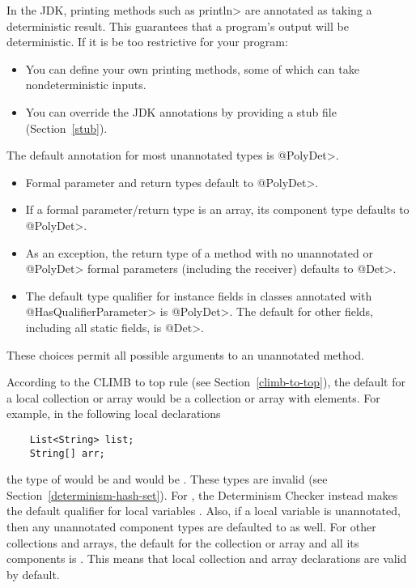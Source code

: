 
In the JDK, printing methods such as \<println> are annotated as taking a
deterministic result.  This guarantees that a program's output will be
deterministic.  If it is be too restrictive for your program:
\begin{itemize}
\item
  You can define your own printing methods, some of which can take
  nondeterministic inputs.
\item
  You can override the JDK annotations by providing a stub file
  (Section~\ref{stub}).
\end{itemize}



The default annotation for most unannotated types is \<@PolyDet>.

\begin{itemize}
\item
  Formal parameter and return types default to \<@PolyDet>.
\item
  If a formal parameter/return type is an array, its component type defaults to
  \<@PolyDet>.
\item
  As an exception, the return type of a method with no unannotated or
  \<@PolyDet> formal parameters (including the receiver) defaults to
  \<@Det>.
\item
  The default type qualifier for instance fields in classes annotated with
  \<@HasQualifierParameter> is \<@PolyDet>. The default for other fields,
  including all static fields, is \<@Det>.
\end{itemize}

These choices permit all possible arguments to an unannotated method.

According to the CLIMB to top rule (see Section~\ref{climb-to-top}), the default
for a local collection or array would be a  collection or array
with  elements. For example, in the following local declarations
\begin{Verbatim}
    List<String> list;
    String[] arr;
\end{Verbatim}
the type of  would be  and
 would be . These types are invalid (see
Section~\ref{determinism-hash-set}). For , the Determinism Checker
instead makes the default qualifier for local variables . Also, if a local
 variable is unannotated, then any unannotated component types are
defaulted to  as well. For other collections and arrays, the default
for the collection or array and all its components is . This means
that local collection and array declarations are valid by default.

